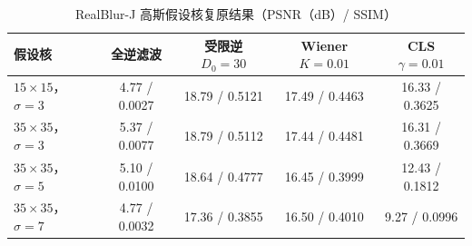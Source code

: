 \begin{table}[htbp]
\centering
\footnotesize
\setlength{\tabcolsep}{4pt}
\caption{RealBlur-J 高斯假设核复原结果（PSNR（dB）/ SSIM）}
\label{tab:rb-gauss}
\begin{tabular}{lcccc}
\toprule
假设核 & 全逆滤波 & 受限逆 $D_0=30$ & Wiener $K=0.01$ & CLS $\gamma=0.01$ \\
\midrule
$ 15\times15$，$\sigma=3$ & 4.77 / 0.0027 & 18.79 / 0.5121 & 17.49 / 0.4463 & 16.33 / 0.3625 \\
$ 35\times35$，$\sigma=3$ & 5.37 / 0.0077 & 18.79 / 0.5112 & 17.44 / 0.4481 & 16.31 / 0.3669 \\
$ 35\times35$，$\sigma=5$ & 5.10 / 0.0100 & 18.64 / 0.4777 & 16.45 / 0.3999 & 12.43 / 0.1812 \\
$ 35\times35$，$\sigma=7$ & 4.77 / 0.0032 & 17.36 / 0.3855 & 16.50 / 0.4010 & 9.27 / 0.0996 \\
\bottomrule
\end{tabular}
\end{table}
